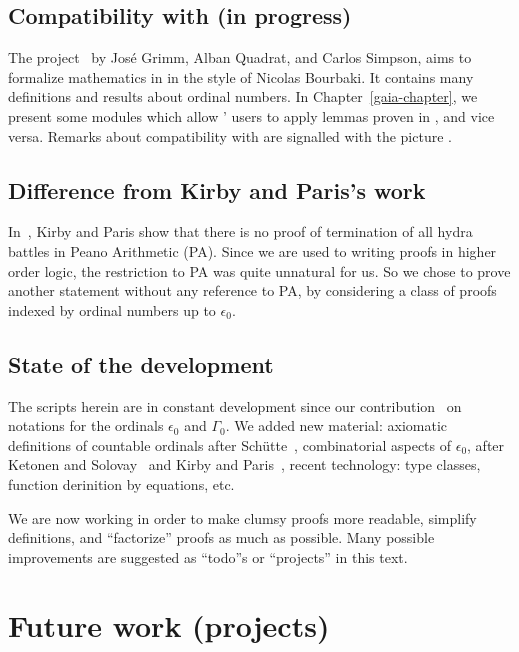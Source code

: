 \subsection*{Compatibility with \gaia (in progress)}
The \gaia project~\cite{Gaia} by Jos\'e Grimm, Alban Quadrat,  and Carlos Simpson,
aims  to formalize mathematics in \coq  in
the style of Nicolas Bourbaki. It contains many definitions and results about ordinal numbers. In Chapter~\ref{gaia-chapter}, we present some modules which allow \HydrasLib' users to apply lemmas proven in \gaia, and vice versa. Remarks about compatibility with \gaia are signalled with the picture \gaiasign.
 


\subsection*{Difference from Kirby and Paris's work}
In~\cite{KP82}, Kirby and Paris show  that there is no proof of termination of all hydra battles in Peano Arithmetic (PA).
Since we are used to writing proofs in higher order logic, the restriction to PA was quite unnatural for us. So we chose to prove another statement without any reference to PA, by considering a class of proofs indexed by ordinal numbers up to $\epsilon_0$.

\subsection*{State of the development}
The \coq{} scripts herein are in constant development since our contribution~\cite{CantorContrib} on  notations for the ordinals $\epsilon_0$ and $\Gamma_0$.
We added new material: axiomatic definitions of countable ordinals after Schütte~\cite{schutte}, combinatorial aspects of $\epsilon_0$, after Ketonen and Solovay~\cite{KS81} and Kirby and Paris~\cite{KP82}, recent \coq{} technology: type classes, function derinition by equations, etc.

We are now working in order to make clumsy proofs more readable, simplify definitions, and ``factorize'' proofs as much as possible. 
Many possible improvements are suggested as ``todo''s or ``projects'' in this text.


\section*{Future work (projects)}


